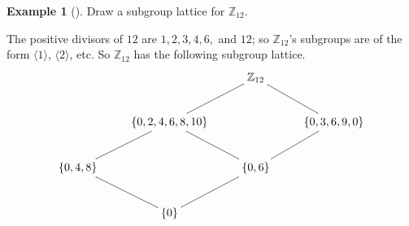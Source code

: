 \documentclass[10pt,]{book}
\theoremstyle{plain}
\theoremstyle{definition}
\theoremstyle{definition}
\theoremstyle{definition}
\newtheorem{example}[theorem]{Example}
\theoremstyle{definition}
\numberwithin{equation}{section}
\def\Z{\mathbb{Z}}
\begin{document}
\begin{example}[]\label{example-47}
Draw a subgroup lattice for \(\Z_{12}\).%
\par
The positive divisors of \(12\) are \(1,2,3,4,6,\) and \(12\); so \(\Z_{12}\)'s subgroups are of the form \(\langle 1\rangle\), \(\langle 2\rangle\), etc. So \(\Z_{12}\) has the following subgroup lattice.%
{
      \[ \xymatrix{
& &\Z_{12} \ar@{-}[ld] \ar@{-}[rd]&\\
&\{0,2,4,6,8,10\} \ar@{-}[ld]\ar@{-}[rd]& &\{0, 3,6,9,0\} \ar@{-}[ld]\\ \{0,4,8\}\ar@{-}[dr]& & \{0,6\} \ar@{-}[dl]& \\
& \{0\} & &} \]
}
\end{example}
\typeout{************************************************}
\typeout{************************************************}
\end{document}
